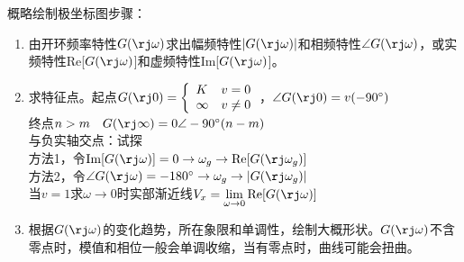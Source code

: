\documentclass[handout,cjkutf8,table,aspectratio=1610]{beamer} %
\begin{document}
\begin{frame}{概略绘制极坐标图步骤：}
	\begin{enumerate}[(1)]
		\item 由开环频率特性$G(\rj\omega)$求出幅频特性$|G(\rj\omega)|$和相频特性$\angle G(\rj\omega)$，或实频特性Re[$G(\rj\omega)$]和虚频特性Im[$G(\rj\omega)$]。
		\item 求特征点。起点$G(\rj 0) = \left\{\begin{array}{ll}K&v=0\\ \infty&v\neq 0\end{array}\right.$，$\angle G(\rj 0) = v(-90^\circ)$\\
		终点$n>m\quad G(\rj\infty) = 0\angle -90^\circ (n-m)$\\
		与负实轴交点：试探\\
		方法1，令$\text{Im}[G(\rj\omega)] = 0\rightarrow \omega_g\rightarrow\text{Re}[G(\rj\omega_g)]$\\
		方法2，令$\angle G(\rj\omega) = -180^\circ \rightarrow \omega_g\rightarrow |G(\rj\omega_g)|$\\
		当$v=1$求$\omega\rightarrow 0$时实部渐近线$V_x=\lim\limits_{\omega\rightarrow 0}\text{Re}[G(\rj\omega)]$
		\item 根据$G(\rj\omega)$的变化趋势，所在象限和单调性，绘制大概形状。$G(\rj\omega)$不含零点时，模值和相位一般会单调收缩，当有零点时，曲线可能会扭曲。
	\end{enumerate}
\end{frame}
\end{document}
